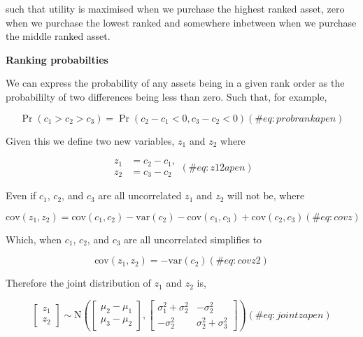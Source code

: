 such that utility is maximised when we purchase the highest ranked
asset, zero when we purchase the lowest ranked and somewhere inbetween
when we purchase the middle ranked asset.

\textbf{Ranking probabilties}

We can express the probability of any assets being in a given rank order
as the probabililty of two differences being less than zero. Such that,
for example,

\begin{equation}
\Pr(c_1 > c_2 > c_3) = \Pr(c_2 - c_1 < 0,  c_3 - c_2 < 0)
(\#eq:probrankapen)
\end{equation}

Given this we define two new variables, \(z_1\) and \(z_2\) where

\begin{equation}
\begin{aligned}
  z_1 &= c_2 - c_1,\\
  z_2 &= c_3 - c_2
\end{aligned}
(\#eq:z12apen)
\end{equation}

Even if \(c_1\), \(c_2\), and \(c_3\) are all uncorrelated \(z_1\) and
\(z_2\) will not be, where

\begin{equation}
\mathrm{cov}(z_1, z_2)=\mathrm{cov}(c_1, c_2) - \mathrm{var}(c_2) - \mathrm{cov}(c_1, c_3) + \mathrm{cov}(c_2, c_3)
(\#eq:covz)
\end{equation}

Which, when \(c_1\), \(c_2\), and \(c_3\) are all uncorrelated
simplifies to

\begin{equation}
\mathrm{cov}(z_1, z_2)=-\mathrm{var}(c_2)
(\#eq:covz2)
\end{equation}

Therefore the joint distribution of \(z_1\) and \(z_2\) is,

\begin{equation}
\begin{bmatrix}z_1\\z_2\end{bmatrix}
  \sim\mathrm{N}\left(
  \begin{bmatrix}\mu_2-\mu_1\\\mu_3-\mu_2\end{bmatrix},
  \begin{bmatrix}\sigma^2_1+\sigma^2_2&-\sigma^2_2\\-\sigma^2_2&\sigma^2_2+\sigma^2_3\end{bmatrix}\right)
(\#eq:jointzapen)
\end{equation}

